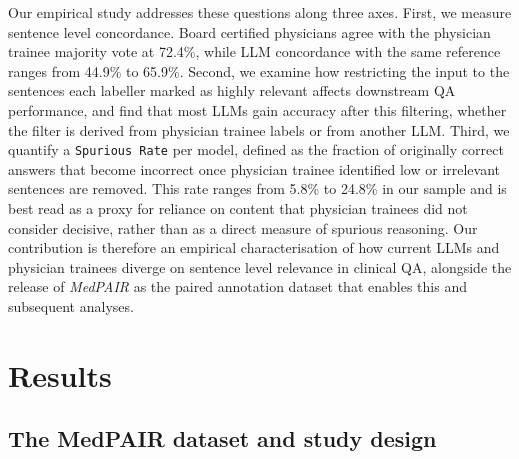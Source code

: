 \documentclass[fleqn,10pt]{wlscirep}
\def\ourmetric{\texttt{Spurious Rate}\xspace}
\begin{document}
Our empirical study addresses these questions along three axes. First, we measure sentence level concordance. Board certified physicians agree with the physician trainee majority vote at 72.4\%, while LLM concordance with the same reference ranges from 44.9\% to 65.9\%. Second, we examine how restricting the input to the sentences each labeller marked as highly relevant affects downstream QA performance, and find that most LLMs gain accuracy after this filtering, whether the filter is derived from physician trainee labels or from another LLM. Third, we quantify a \ourmetric per model, defined as the fraction of originally correct answers that become incorrect once physician trainee identified low or irrelevant sentences are removed. This rate ranges from 5.8\% to 24.8\% in our sample and is best read as a proxy for reliance on content that physician trainees did not consider decisive, rather than as a direct measure of spurious reasoning. Our contribution is therefore an empirical characterisation of how current LLMs and physician trainees diverge on sentence level relevance in clinical QA, alongside the release of \emph{MedPAIR} as the paired annotation dataset that enables this and subsequent analyses.  %

\section{Results}
\subsection{The MedPAIR dataset and study design}
\end{document}
